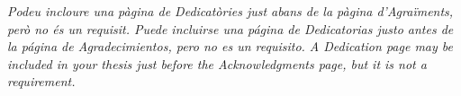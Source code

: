 \clearpage
\thispagestyle{empty}             %
\vspace*{4cm}                     %
\hfill                            %
\begin{minipage}{0.8\textwidth}   %
  \raggedleft\itshape             %
  \ifcase\doclanguage\or          %
    Podeu incloure una pàgina de Dedicatòries just abans de la pàgina d’Agraïments, però no és un requisit.\or
    Puede incluirse una página de Dedicatorias justo antes de la página de Agradecimientos, pero no es un requisito.\else
    A Dedication page may be included in your thesis just before the Acknowledgments page, but it is not a requirement.\fi
\end{minipage}
